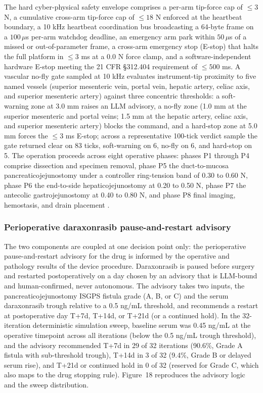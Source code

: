The hard cyber-physical safety envelope comprises a per-arm tip-force cap of
$\leq 3$ N, a cumulative cross-arm tip-force cap of $\leq 18$ N enforced at the
heartbeat boundary, a 10 kHz heartbeat coordination bus broadcasting a 64-byte frame
on a $100\,\mu$s per-arm watchdog deadline, an emergency arm park within $50\,\mu$s
of a missed or out-of-parameter frame, a cross-arm emergency stop (E-stop) that
halts the full platform in $\leq 3$ ms at a 0.0 N force clamp, and a
software-independent hardware E-stop meeting the 21 CFR \S 312.404 requirement of
$\leq 500$ ms. A vascular no-fly gate sampled at 10 kHz evaluates instrument-tip
proximity to five named vessels (superior mesenteric vein, portal vein, hepatic
artery, celiac axis, and superior mesenteric artery) against three concentric
thresholds: a soft-warning zone at 3.0 mm raises an LLM advisory, a no-fly zone
(1.0 mm at the superior mesenteric and portal veins; 1.5 mm at the hepatic artery,
celiac axis, and superior mesenteric artery) blocks the command, and a hard-stop
zone at 5.0 mm forces the $\leq 3$ ms E-stop; across a representative 100-tick
verdict sample the gate returned clear on 83 ticks, soft-warning on 6, no-fly on 6,
and hard-stop on 5. The operation proceeds across eight operative phases: phases P1
through P4 comprise dissection and specimen removal, phase P5 the duct-to-mucosa
pancreaticojejunostomy under a controller ring-tension band of 0.30 to 0.60 N, phase
P6 the end-to-side hepaticojejunostomy at 0.20 to 0.50 N, phase P7 the antecolic
gastrojejunostomy at 0.40 to 0.80 N, and phase P8 final imaging, hemostasis, and
drain placement \cite{onpremwhippl}.

\subsubsection*{Perioperative daraxonrasib pause-and-restart advisory}

The two components are coupled at one decision point only: the perioperative
pause-and-restart advisory for the drug is informed by the operative and pathology
results of the device procedure. Daraxonrasib is paused before surgery and restarted
postoperatively on a day chosen by an advisory that is LLM-bound and human-confirmed,
never autonomous. The advisory takes two inputs, the pancreaticojejunostomy ISGPS
fistula grade (A, B, or C) and the serum daraxonrasib trough relative to a 0.5 ng/mL
threshold, and recommends a restart at postoperative day T+7d, T+14d, or T+21d (or a
continued hold). In the 32-iteration deterministic simulation sweep, baseline serum
was 0.45 ng/mL at the operative timepoint across all iterations (below the 0.5 ng/mL
trough threshold), and the advisory recommended T+7d in 29 of 32 iterations (90.6\%,
Grade A fistula with sub-threshold trough), T+14d in 3 of 32 (9.4\%, Grade B or
delayed serum rise), and T+21d or continued hold in 0 of 32 (reserved for Grade C,
which also maps to the drug stopping rule). Figure~18 reproduces the advisory logic
and the sweep distribution.

